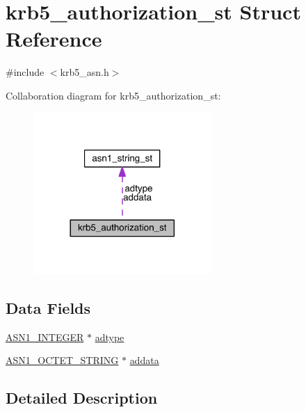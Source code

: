 \hypertarget{structkrb5__authorization__st}{}\section{krb5\+\_\+authorization\+\_\+st Struct Reference}
\label{structkrb5__authorization__st}


{\ttfamily \#include $<$krb5\+\_\+asn.\+h$>$}



Collaboration diagram for krb5\+\_\+authorization\+\_\+st\+:\nopagebreak
\begin{figure}[H]
\begin{center}
\leavevmode
\includegraphics[width=192pt]{structkrb5__authorization__st__coll__graph}
\end{center}
\end{figure}
\subsection*{Data Fields}
\begin{DoxyCompactItemize}
\item 
\hyperlink{crypto_2ossl__typ_8h_af4335399bf9774cb410a5e93de65998b}{A\+S\+N1\+\_\+\+I\+N\+T\+E\+G\+ER} $\ast$ \hyperlink{structkrb5__authorization__st_a2bff54a42c4451a51c8cbb5d65d03d27}{adtype}
\item 
\hyperlink{crypto_2ossl__typ_8h_afbd05e94e0f0430a2b729473efec88c1}{A\+S\+N1\+\_\+\+O\+C\+T\+E\+T\+\_\+\+S\+T\+R\+I\+NG} $\ast$ \hyperlink{structkrb5__authorization__st_a06170b1f23649e781758a51d7a65541f}{addata}
\end{DoxyCompactItemize}


\subsection{Detailed Description}


